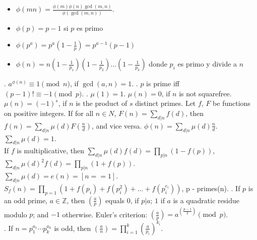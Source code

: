 \begin{itemize}
\item   $\phi(mn) = \frac{\phi(m) \phi(n) \gcd(m,n)}{\phi(\gcd(m,n))}$.
\item	$\phi(p) = p - 1$ si $p$ es primo
\item	$\phi(p^a) = p^a(1 - \frac{1}{p}) = p^{a-1} (p-1)$
\item	$\phi(n) = n(1 - \frac{1}{p_1})(1 - \frac{1}{p_2})...(1 - \frac{1}{p_k})$ donde $p_i$ es primo y divide a $n$
\end{itemize}
. $a^{\phi(n)} \equiv 1\pmod{n}$, if $\gcd(a,n)=1$. \TopicBreak
{}. $p$ is prime iff $(p - 1)! \equiv -1 \pmod p$. \TopicBreak
{}.
$\mu(1) = 1$. $\mu(n) = 0$, if $n$ is not squarefree.
$\mu(n) = (-1)^s$, if $n$ is the product of $s$ distinct primes.
Let $f$, $F$ be functions on positive integers.
If for all $n \in N$, $F(n)=\sum_{d|n} f(d)$, then $f(n) = \sum_{d|n} \mu(d) F(\frac{n}{d})$,
and vice versa. \quad
$\phi(n) = \sum_{d|n} \mu(d) \frac{n}{d}$.
\quad $\sum_{d|n} \mu(d) = 1$. \\
If $f$ is multiplicative, then $\sum_{d|n} \mu(d) f(d) = \prod_{p|n}(1-f(p))$,
$\sum_{d|n} \mu(d)^2 f(d) = \prod_{p|n} (1+f(p))$. \\
$\sum_{d|n} \mu(d) = e(n) = [n==1]$. \\
$S_{f}(n) = \prod_{p = 1} (1+f(p_i) + f(p_i^2 ) +... + f(p_i^{e_i})) $, p - primes(n). \TopicBreak
{}. If $p$ is an odd prime, $a \in {\mathbb Z}$, then
$\left(\frac{a}{p}\right)$ equals $0$, if $p | a$; $1$ if $a$ is a quadratic
residue modulo $p$; and $-1$ otherwise.
Euler's criterion:
$\left(\frac{a}{p}\right)=a^{\left(\frac{p-1}{2}\right)} \pmod p$. \\
.  %
If $n=p_1^{a_1} \cdots p_k^{a_k}$ is odd, then
$\left(\frac{a}{n}\right) = \prod_{i=1}^k \left(\frac{a}{p_i}\right)^{k_i}$. \\
